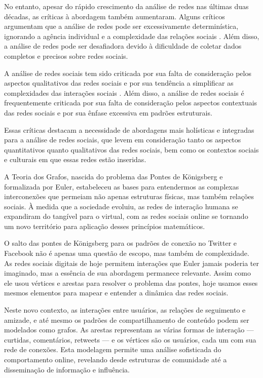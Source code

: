 No entanto, apesar do rápido crescimento da análise de redes nas últimas duas décadas, as críticas à abordagem também aumentaram. Alguns críticos argumentam que a análise de redes pode ser excessivamente determinística, ignorando a agência individual e a complexidade das relações sociais \cite{1991_Scott}. Além disso, a análise de redes pode ser desafiadora devido à dificuldade de coletar dados completos e precisos sobre redes sociais.

A análise de redes sociais tem sido criticada por sua falta de consideração pelos aspectos qualitativos das redes sociais e por sua tendência a simplificar as complexidades das interações sociais \cite{2013_Gruzd}. Além disso, a análise de redes sociais é frequentemente criticada por sua falta de consideração pelos aspectos contextuais das redes sociais e por sua ênfase excessiva em padrões estruturais.

Essas críticas destacam a necessidade de abordagens mais holísticas e integradas para a análise de redes sociais, que levem em consideração tanto os aspectos quantitativos quanto qualitativos das redes sociais, bem como os contextos sociais e culturais em que essas redes estão inseridas.

A Teoria dos Grafos, nascida do problema das Pontes de Königsberg e formalizada por Euler, estabeleceu as bases para entendermos as complexas interconexões que permeiam não apenas estruturas físicas, mas também relações sociais. À medida que a sociedade evoluiu, as redes de interação humana se expandiram do tangível para o virtual, com as redes sociais online se tornando um novo território para aplicação desses princípios matemáticos.

O salto das pontes de Königsberg para os padrões de conexão no Twitter e Facebook não é apenas uma questão de escopo, mas também de complexidade. As redes sociais digitais de hoje permitem interações que Euler jamais poderia ter imaginado, mas a essência de sua abordagem permanece relevante. Assim como ele usou vértices e arestas para resolver o problema das pontes, hoje usamos esses mesmos elementos para mapear e entender a dinâmica das redes sociais.

Neste novo contexto, as interações entre usuários, as relações de seguimento e amizade, e até mesmo os padrões de compartilhamento de conteúdo podem ser modelados como grafos. As arestas representam as várias formas de interação — curtidas, comentários, retweets — e os vértices são os usuários, cada um com sua rede de conexões. Esta modelagem permite uma análise sofisticada do comportamento online, revelando desde estruturas de comunidade até a disseminação de informação e influência.

